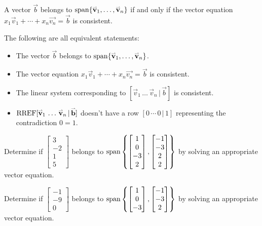 \begin{fact}
  A vector \(\vec b\) belongs to
  \(\operatorname{span}\{\mathbf{\accentset{\rightharpoonup}{v}}_1,\dots,\mathbf{\accentset{\rightharpoonup}{v}}_n\}\) if and only if
	the vector equation \(x_1 \vec{v}_1+\cdots+x_n \vec{v_n}=\vec{b}\) is consistent.
\end{fact}

\begin{quickcheck}
The following are all equivalent statements:
\begin{itemize}
\item The vector \(\vec{b}\) belongs to \(\operatorname{span}\{\mathbf{\accentset{\rightharpoonup}{v}}_1,\dots,\mathbf{\accentset{\rightharpoonup}{v}}_n\}\).
\item The vector equation \(x_1 \vec{v}_1+\cdots+x_n \vec{v_n}=\vec{b}\) is consistent.
\item The linear system corresponding to
  \([\vec v_1\,\dots\,\vec v_n \,|\, \vec b]\)
  is consistent.
\item  \(\operatorname{RREF}[\mathbf{\accentset{\rightharpoonup}{v}}_1\,\dots\,\mathbf{\accentset{\rightharpoonup}{v}}_n \,|\, \mathbf{\accentset{\rightharpoonup}{b}}]\)
  doesn't have a row \([0\,\cdots\,0\,|\,1]\)
  representing the contradiction \(0=1\).
\end{itemize}
\end{quickcheck}

\begin{activity}{10}
  Determine if
  \(\begin{bmatrix}3\\-2\\1 \\ 5\end{bmatrix}\) belongs to
  \(\operatorname{span}\left\{\begin{bmatrix}1\\0\\-3 \\ 2\end{bmatrix},
  \begin{bmatrix}-1\\-3\\2 \\ 2\end{bmatrix}\right\}\)
  by solving an appropriate vector equation.
\end{activity}

\begin{activity}{5}
  Determine if
  \(\begin{bmatrix}-1\\-9\\0\end{bmatrix}\) belongs to
  \(\operatorname{span}\left\{\begin{bmatrix}1\\0\\-3\end{bmatrix},
  \begin{bmatrix}-1\\-3\\2\end{bmatrix}\right\}\)
  by solving an appropriate vector equation.
\end{activity}


